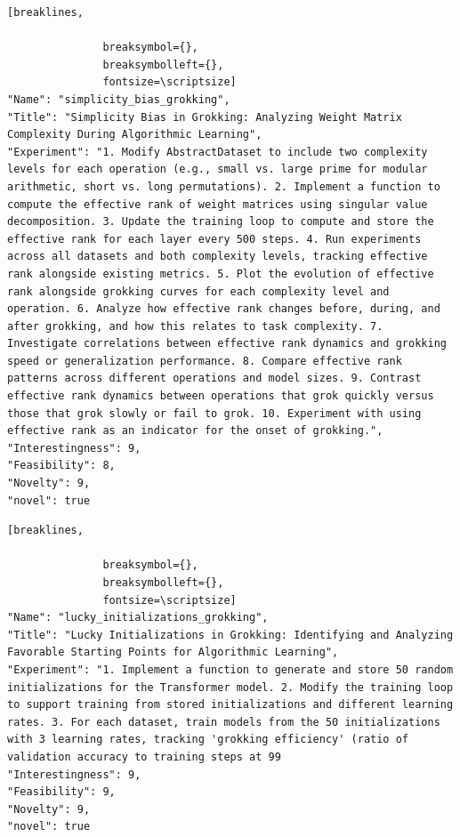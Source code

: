 \begin{tcolorbox}[
  breakable,
  colback  = blue!5!white,
  colframe = blue!75!black,
  title    = {Idea 33/50 - \texttt{simplicity\_bias\_grokking}},
  fontupper=\scriptsize\ttfamily,
]
\begin{Verbatim}[breaklines,

               breaksymbol={},
               breaksymbolleft={},
               fontsize=\scriptsize]
"Name": "simplicity_bias_grokking",
"Title": "Simplicity Bias in Grokking: Analyzing Weight Matrix Complexity During Algorithmic Learning",
"Experiment": "1. Modify AbstractDataset to include two complexity levels for each operation (e.g., small vs. large prime for modular arithmetic, short vs. long permutations). 2. Implement a function to compute the effective rank of weight matrices using singular value decomposition. 3. Update the training loop to compute and store the effective rank for each layer every 500 steps. 4. Run experiments across all datasets and both complexity levels, tracking effective rank alongside existing metrics. 5. Plot the evolution of effective rank alongside grokking curves for each complexity level and operation. 6. Analyze how effective rank changes before, during, and after grokking, and how this relates to task complexity. 7. Investigate correlations between effective rank dynamics and grokking speed or generalization performance. 8. Compare effective rank patterns across different operations and model sizes. 9. Contrast effective rank dynamics between operations that grok quickly versus those that grok slowly or fail to grok. 10. Experiment with using effective rank as an indicator for the onset of grokking.",
"Interestingness": 9,
"Feasibility": 8,
"Novelty": 9,
"novel": true
\end{Verbatim}
\end{tcolorbox}

\begin{tcolorbox}[
  breakable,
  colback  = blue!5!white,
  colframe = blue!75!black,
  title    = {Idea 34/50 - \texttt{lucky\_initializations\_grokking}},
  fontupper=\scriptsize\ttfamily,
]
\begin{Verbatim}[breaklines,

               breaksymbol={},
               breaksymbolleft={},
               fontsize=\scriptsize]
"Name": "lucky_initializations_grokking",
"Title": "Lucky Initializations in Grokking: Identifying and Analyzing Favorable Starting Points for Algorithmic Learning",
"Experiment": "1. Implement a function to generate and store 50 random initializations for the Transformer model. 2. Modify the training loop to support training from stored initializations and different learning rates. 3. For each dataset, train models from the 50 initializations with 3 learning rates, tracking 'grokking efficiency' (ratio of validation accuracy to training steps at 99
"Interestingness": 9,
"Feasibility": 9,
"Novelty": 9,
"novel": true
\end{Verbatim}
\end{tcolorbox}

